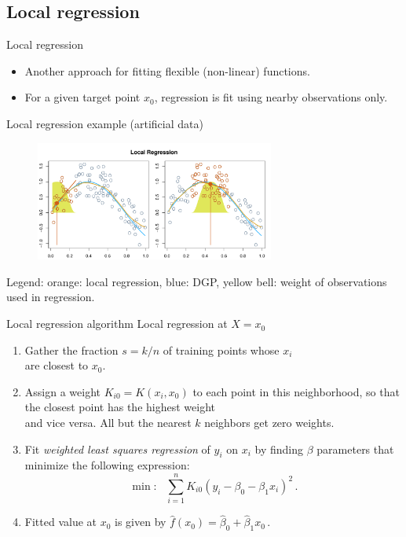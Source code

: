 \documentclass{beamer}
\begin{document}
\subsection{Local regression}
\begin{frame}{Local regression}
\begin{itemize}
    \item Another approach for fitting flexible (non-linear) functions.
    \item For a given target point $x_0$, regression is fit using nearby observations only.
\end{itemize}
\bigskip
\centering
Local regression example (artificial data)
\vspace{-0.4cm}
\begin{figure}
  \centering
  \includegraphics[trim=0cm 0cm 0cm 1.1cm, clip=true, width=0.7\textwidth]{IMG/ISLR79.pdf}
\end{figure}
\vspace{-0.4cm}
\tiny{Legend: orange: local regression, blue: DGP, yellow bell: weight of observations used in regression.}
\end{frame}
\begin{frame}{Local regression algorithm}
Local regression at $X = x_0$\\
\bigskip
\begin{enumerate}
    \item Gather the fraction $s = k/n$ of training points whose $x_i$ \\are closest to $x_0$.
    \medskip
    \item Assign a weight $K_{i0} = K(x_i , x_0)$ to each point in this neighborhood, so that the closest point has the highest weight \\and vice versa. All but the nearest $k$ neighbors get zero weights.
    \medskip
    \item Fit \textit{weighted least squares regression} of $y_i$ on $x_i$ by finding $\beta$ parameters that minimize the following expression:
    $$\min : ~~~ \sum_{i=1}^n K_{i0} (y_i - \beta_0 - \beta_1 x_i)^2 \,.$$
    \item Fitted value at $x_0$ is given by $\hat{f}(x_0) = \hat{\beta}_0 + \hat{\beta}_1 x_0\,$.
\end{enumerate}
\end{frame}
\end{document}
